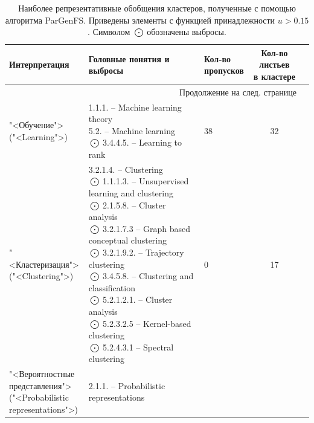 \documentclass[12pt]{article}
\begin{document}
\newcommand{\offshoot}{$\bigodot \ $}
\newcommand{\gap}{$\bigotimes\ \ $}
\newcommand{\makecelll}[1]{\makecell[l]{#1}}
\begin{center}
	\def\arraystretch{0.7}
	{\footnotesize \begin{longtable}{|l|l|l|c|c|}
			\caption{Наиболее репрезентативные обобщения кластеров, полученные с помощью алгоритма ParGenFS. Приведены элементы с функцией принадлежности $u>0.15$. Символом \offshoot обозначены выбросы.}
			\label{table:pars_results}\\
			\hline
			Интерпретация  & Головные понятия и выбросы & \makecelll{Кол-во\\пропусков} & \makecelll{Кол-во листьев \\в кластере} \\ 
			\hline
			\endhead
			\hline
			\multicolumn{4}{r}{{Продолжение на след. странице}} \\
			\endfoot
			\hline
			\endlastfoot
		\makecelll{"<Обучение">\\("<Learning">)} & \makecelll{1.1.1. -- Machine learning theory\\
		5.2. -- Machine learning\\
		\offshoot 3.4.4.5. -- Learning to rank}
	& 38 & 32
		   \\ 
		\hline 
		\makecelll{"<Кластеризация">\\("<Clustering">)} & \makecelll{3.2.1.4. -- Clustering\\
		\offshoot	1.1.1.3. -- Unsupervised learning and clustering\\
		\offshoot	2.1.5.8. -- Cluster analysis\\
		\offshoot	3.2.1.7.3 -- Graph based conceptual clustering\\
		\offshoot	3.2.1.9.2. -- Trajectory clustering\\
		\offshoot	3.4.5.8. -- Clustering and classification\\
		\offshoot	5.2.1.2.1. -- Cluster analysis\\
		\offshoot	5.2.3.2.5 -- Kernel-based clustering\\
		\offshoot	5.2.4.3.1 -- Spectral clustering\\
		} & 0 & 17\\ 
		\hline 
		\makecelll{"<Вероятностные\\представления">\\("<Probabilistic\\representations">)}   & \makecelll{2.1.1. -- Probabilistic representations\\
}
\end{longtable}}
\end{center}
\end{document}
